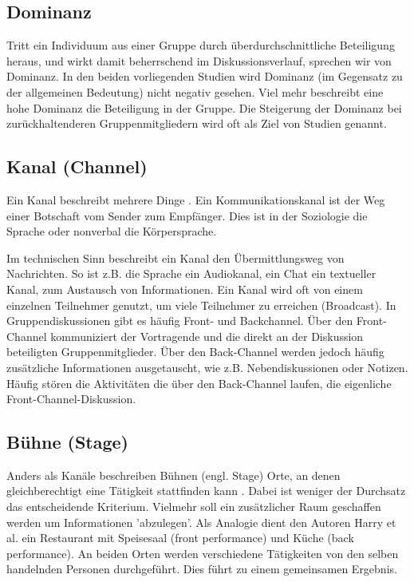 \documentclass{seminarvorlage}
\begin{document}
\subsection{Dominanz}
Tritt ein Individuum aus einer Gruppe durch üb\-er\-durch\-schnitt\-liche
Beteiligung heraus, und wirkt damit beherrschend im Diskussionsverlauf, sprechen
wir von Dominanz.
In den beiden vorliegenden Studien \cite{HarGorSch2012} \cite{KimChaHolPent2008}
wird Dominanz (im Gegensatz zu der allgemeinen Bedeutung) nicht negativ
gesehen. Viel mehr beschreibt eine hohe Dominanz die Beteiligung in der Gruppe.
Die Steigerung der Dominanz bei zurückhaltenderen Gruppenmitgliedern wird oft
als Ziel von Studien genannt.

\subsection{Kanal (Channel)}
Ein Kanal beschreibt mehrere Dinge \cite{BergKara2009-1}.
Ein Kommunikationskanal ist der Weg einer Botschaft vom Sender zum
Empfänger. Dies ist in der Soziologie die Sprache oder non\-verbal die
Kör\-per\-spra\-che.

Im technischen Sinn beschreibt ein Kanal den Über\-mitt\-lungs\-weg von
Nachrichten.
So ist z.B. die Sprache ein Audiokanal, ein Chat ein textueller Kanal,
zum Austausch von Informationen. Ein Kanal wird oft von einem einzelnen
Teilnehmer genutzt, um viele Teilnehmer zu erreichen (Broadcast).
In Gruppendiskussionen gibt es häufig Front- und Backchannel. Über den
Front-Channel kommuniziert der Vortragende und die direkt an der Diskussion
beteiligten Gruppenmitglieder. Über den Back-Channel werden jedoch häufig
zusätzliche Informationen ausgetauscht, wie z.B. Nebendiskussionen oder Notizen.
Häufig stören die Aktivitäten die über den Back-Channel laufen, die eigenliche
Front-Channel-Diskussion.

\subsection{Bühne (Stage)}
Anders als Kanäle beschreiben Bühnen (engl. Stage) Orte, an denen
gleichberechtigt eine Tätigkeit stattfinden kann \cite{Goff1959}. Dabei ist
weniger der Durchsatz das entscheidende Kriterium. Vielmehr soll ein
zusätzlicher Raum geschaffen werden um Informationen 'abzulegen'. Als Analogie dient den
Autoren Harry et al. \cite{HarGorSch2012} ein Restaurant mit Speisesaal (front performance) und Küche
(back performance).
An beiden Orten werden verschiedene Tätigkeiten von den selben handelnden
Personen durchgeführt. Dies führt zu einem gemeinsamen Ergebnis.
\end{document}
